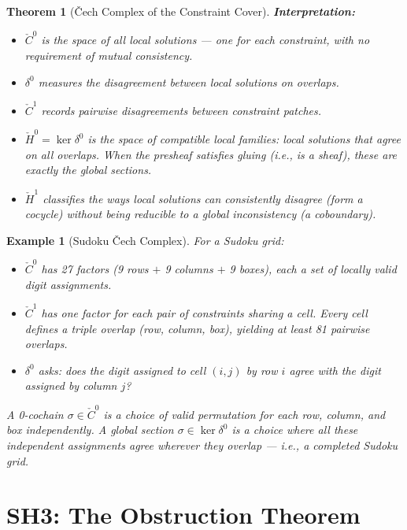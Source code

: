 \documentclass[11pt,letterpaper]{article}
\newtheorem{theorem}[conjecture]{Theorem}
\newtheorem{example}[conjecture]{Example}
\newcommand{\Cech}{\check{C}}
\newcommand{\Hcech}{\check{H}}
\begin{document}
\begin{theorem}[\v{C}ech Complex of the Constraint 
Cover]
\textbf{Interpretation:} 
\begin{itemize}
    \item $\Cech^0$ is the space of \emph{all local solutions} --- one 
    for each constraint, with no requirement of mutual consistency.
    \item $\delta^0$ measures the \emph{disagreement} between local 
    solutions on overlaps.
    \item $\Cech^1$ records pairwise disagreements between constraint 
    patches.
    \item $\Hcech^0 = \ker \delta^0$ is the space of compatible local 
    families: local solutions that agree on all overlaps. When the 
    presheaf satisfies gluing (i.e., is a sheaf), these are exactly 
    the global sections.
    \item $\Hcech^1$ classifies the ways local solutions can 
    \emph{consistently disagree} (form a cocycle) without being 
    reducible to a global inconsistency (a coboundary).
\end{itemize}
\end{theorem}

\begin{example}[Sudoku \v{C}ech Complex]\label{ex:sudoku_cech}
For a Sudoku grid:
\begin{itemize}
    \item $\Cech^0$ has 27 factors (9 rows $+$ 9 columns $+$ 9 boxes), 
    each a set of locally valid digit assignments.
    \item $\Cech^1$ has one factor for each pair of constraints sharing 
    a cell. Every cell defines a triple overlap (row, column, box), 
    yielding at least 81 pairwise overlaps.
    \item $\delta^0$ asks: does the digit assigned to cell $(i,j)$ by 
    row $i$ agree with the digit assigned by column $j$?
\end{itemize}
A \emph{0-cochain} $\sigma \in \Cech^0$ is a choice of valid 
permutation for each row, column, and box independently. A 
\emph{global section} $\sigma \in \ker \delta^0$ is a choice where all 
these independent assignments agree wherever they overlap --- i.e., a 
completed Sudoku grid.
\end{example}

\section{SH3: The Obstruction Theorem}
\end{document}
